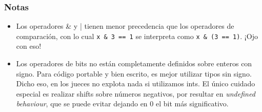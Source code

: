 \subsubsection*{Notas}
\begin{itemize}
	\item Los operadores \& y | tienen menor precedencia que los operadores de comparación, con lo cual \lstinline{x & 3 == 1} se interpreta como \lstinline{x & (3 == 1)}. ¡Ojo con eso!
	\item Los operadores de bits no están completamente definidos sobre enteros con signo. Para código portable y bien escrito, es mejor utilizar tipos sin signo. Dicho eso, en los jueces no explota nada si utilizamos ints. El único cuidado especial es realizar shifts sobre números negativos, por resultar en \textit{undefined behaviour}, que se puede evitar dejando en $0$ el bit más significativo.
\end{itemize}



